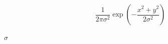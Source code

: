 \documentclass{article}
\begin{document}
\[ \frac{1}{2 \pi \sigma^2} \exp\left(-\frac{x^2 + y^2}{2 \sigma^2}\right) \]
\pagebreak

$\sigma$
\pagebreak
\end{document}
